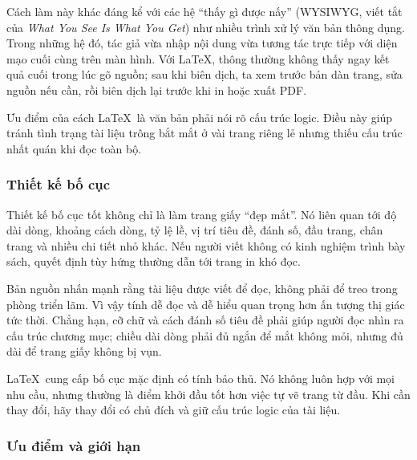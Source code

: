 \documentclass[11pt]{article}
\begin{document}
Cách làm này khác đáng kể với các hệ ``thấy gì được nấy'' (WYSIWYG, viết tắt
của \emph{What You See Is What You Get}) như nhiều trình xử lý văn bản thông
dụng. Trong những hệ đó, tác giả vừa nhập nội dung vừa tương tác trực tiếp với
diện mạo cuối cùng trên màn hình. Với \LaTeX, thông thường không thấy ngay kết
quả cuối trong lúc gõ nguồn; sau khi biên dịch, ta xem trước bản dàn trang, sửa
nguồn nếu cần, rồi biên dịch lại trước khi in hoặc xuất PDF.

Ưu điểm của cách \LaTeX\ là văn bản phải nói rõ cấu trúc logic. Điều này giúp
tránh tình trạng tài liệu trông bắt mắt ở vài trang riêng lẻ nhưng thiếu cấu
trúc nhất quán khi đọc toàn bộ.

\subsubsection{Thiết kế bố cục}

Thiết kế bố cục tốt không chỉ là làm trang giấy ``đẹp mắt''. Nó liên quan tới
độ dài dòng, khoảng cách dòng, tỷ lệ lề, vị trí tiêu đề, đánh số, đầu trang,
chân trang và nhiều chi tiết nhỏ khác. Nếu người viết không có kinh nghiệm
trình bày sách, quyết định tùy hứng thường dẫn tới trang in khó đọc.

Bản nguồn nhấn mạnh rằng tài liệu được viết để đọc, không phải để treo trong
phòng triển lãm. Vì vậy tính dễ đọc và dễ hiểu quan trọng hơn ấn tượng thị
giác tức thời. Chẳng hạn, cỡ chữ và cách đánh số tiêu đề phải giúp người đọc
nhìn ra cấu trúc chương mục; chiều dài dòng phải đủ ngắn để mắt không mỏi,
nhưng đủ dài để trang giấy không bị vụn.

\LaTeX\ cung cấp bố cục mặc định có tính bảo thủ. Nó không luôn hợp với mọi
nhu cầu, nhưng thường là điểm khởi đầu tốt hơn việc tự vẽ trang từ đầu. Khi cần
thay đổi, hãy thay đổi có chủ đích và giữ cấu trúc logic của tài liệu.

\subsubsection{Ưu điểm và giới hạn}
\end{document}
